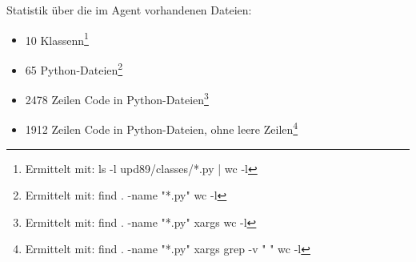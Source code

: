 Statistik über die im Agent vorhandenen Dateien:

\begin{itemize}
\item 10 Klassenn\footnote{Ermittelt mit: ls -l upd89/classes/*.py | wc -l}
\item 65 Python-Dateien\footnote{Ermittelt mit: find . -name "*.py" \textbar wc -l}
\item 2478 Zeilen Code in Python-Dateien\footnote{Ermittelt mit: find . -name "*.py" \textbar xargs wc -l}
\item 1912 Zeilen Code in Python-Dateien, ohne leere Zeilen\footnote{Ermittelt mit: find . -name "*.py" \textbar xargs grep -v "  " \textbar wc -l}
\end{itemize}